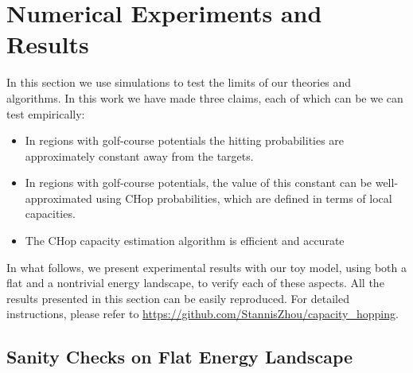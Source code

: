 \documentclass[english, aip, jcp, priprint, graphicx,floatfix]{revtex4-1}
\theoremstyle{plain}
\theoremstyle{definition}
\theoremstyle{plain}
\begin{document}
                                     

\section{Numerical Experiments and Results}\label{sec:experiments}

In this section we use simulations to test the limits of our theories and algorithms.  In this work we have made three claims, each of which can be we can test empirically:

\begin{itemize}
\item In regions with golf-course potentials the hitting probabilities are approximately constant away from the targets.
\item In regions with golf-course potentials, the value of this constant can be well-approximated using CHop probabilities, which are defined in terms of local capacities.
\item The CHop capacity estimation algorithm is efficient and accurate
\end{itemize}

In what follows, we present experimental results with our toy model, using both a flat and a nontrivial energy landscape, to verify each of these aspects.  All the results presented in this section can be easily reproduced. For detailed instructions, please refer to \url{https://github.com/StannisZhou/capacity_hopping}.

\subsection{Sanity Checks on Flat Energy Landscape}
\end{document}
